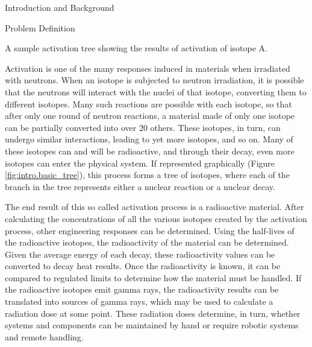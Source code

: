 \begin{chapter}{Introduction and Background}

\begin{section}{Problem Definition\label{sec:intro.prob_def}}

  \begin{floatingfigure}{0.55\columnwidth}
    \begin{center}
      \caption{A sample activation tree showing the results of
        activation of isotope A.}\label{fig:intro.basic_tree}
    \end{center}
  \end{floatingfigure}
  
  Activation is one of the many responses induced in materials when
  irradiated with neutrons.  When an isotope is subjected to neutron
  irradiation, it is possible that the neutrons will interact with the
  nuclei of that isotope, converting them to different isotopes.  Many
  such reactions are possible with each isotope, so that after only
  one round of neutron reactions, a material made of only one isotope
  can be partially converted into over 20 others.  These isotopes, in
  turn, can undergo similar interactions, leading to yet more
  isotopes, and so on.  Many of these isotopes can and will be
  radioactive, and through their decay, even more isotopes can enter
  the physical system.  If represented graphically (Figure
  \ref{fig:intro.basic_tree}), this process forms a tree of isotopes,
  where each of the branch in the tree represents either a nuclear
  reaction or a nuclear decay.
    
  The end result of this so called activation process is a radioactive
  material.  After calculating the concentrations of all the various
  isotopes created by the activation process, other engineering
  responses can be determined.  Using the half-lives of the
  radioactive isotopes, the radioactivity of the material can be
  determined.  Given the average energy of each decay, these
  radioactivity values can be converted to decay heat results.  Once
  the radioactivity is known, it can be compared to regulated limits
  to determine how the material must be handled.  If the radioactive
  isotopes emit gamma rays, the radioactivity results can be
  translated into sources of gamma rays, which may be used to
  calculate a radiation dose at some point.  These radiation doses
  determine, in turn, whether systems and components can be maintained
  by hand or require robotic systems and remote handling.
    

\end{section}
\end{chapter}
